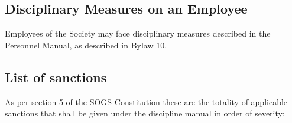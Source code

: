 \subsection {Disciplinary Measures on an Employee} 

\begin{longenum}[ label*=\thesubsection.\arabic*., align=left]  
		\item Employees of the Society may face disciplinary measures described in the Personnel Manual, as described in Bylaw 10.
\end{longenum}
\subsection {List of sanctions} 
As per section 5 of the SOGS Constitution these are the totality of applicable sanctions that shall be given under the discipline manual in order of severity:

